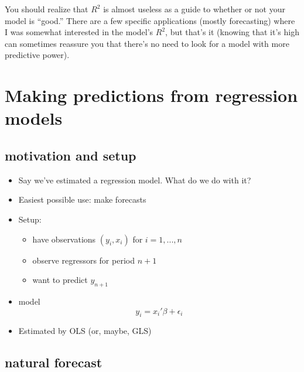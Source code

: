 \begin{itemize}[leftmargin=0pt]
  You should realize that $R^2$ is almost useless as a guide to whether
  or not your model is ``good.''  There are a few specific
  applications (mostly forecasting) where I was somewhat interested in
  the model's $R^2$, but that's it (knowing that it's high can
  sometimes reassure you that there's no need to look for a model with
  more predictive power).

\end{itemize}

\section{Making predictions from regression models}

\subsection{motivation and setup}
\begin{itemize}[leftmargin=0pt]
\item Say we've estimated a regression model.  What do we do with it?
\item Easiest possible use: make forecasts
\item Setup:
\begin{itemize}
\item have observations $(y_i, x_i)$ for $i = 1,...,n$
\item observe regressors for period $n+1$
\item want to predict $y_{n+1}$
\end{itemize}
\item model \[ y_i = x_i'\beta + \epsilon_i \]
\item Estimated by OLS (or, maybe, GLS)
\end{itemize}

\subsection{natural forecast}

